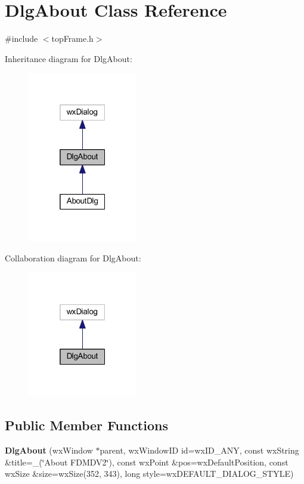 \hypertarget{class_dlg_about}{\section{Dlg\-About Class Reference}
\label{class_dlg_about}
}


{\ttfamily \#include $<$top\-Frame.\-h$>$}



Inheritance diagram for Dlg\-About\-:
\nopagebreak
\begin{figure}[H]
\begin{center}
\leavevmode
\includegraphics[width=136pt]{class_dlg_about__inherit__graph}
\end{center}
\end{figure}


Collaboration diagram for Dlg\-About\-:
\nopagebreak
\begin{figure}[H]
\begin{center}
\leavevmode
\includegraphics[width=136pt]{class_dlg_about__coll__graph}
\end{center}
\end{figure}
\subsection*{Public Member Functions}
\begin{DoxyCompactItemize}
\item 
\hypertarget{class_dlg_about_a2d94603323a5f60eff69a92380fb9042}{{\bfseries Dlg\-About} (wx\-Window $\ast$parent, wx\-Window\-I\-D id=wx\-I\-D\-\_\-\-A\-N\-Y, const wx\-String \&title=\-\_\-(\char`\"{}About F\-D\-M\-D\-V2\char`\"{}), const wx\-Point \&pos=wx\-Default\-Position, const wx\-Size \&size=wx\-Size(352, 343), long style=wx\-D\-E\-F\-A\-U\-L\-T\-\_\-\-D\-I\-A\-L\-O\-G\-\_\-\-S\-T\-Y\-L\-E)}\label{class_dlg_about_a2d94603323a5f60eff69a92380fb9042}

\end{DoxyCompactItemize}
